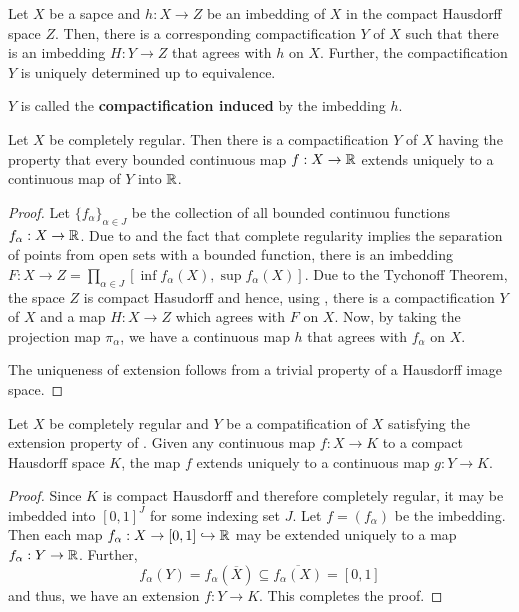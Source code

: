 \begin{lemma}
    Let $X$ be a sapce and $h: X\to Z$ be an imbedding of $X$ in the compact Hausdorff space $Z$. Then, there is a corresponding compactification $Y$ of $X$ such that there is an imbedding $H: Y\to Z$ that agrees with $h$ on $X$. Further, the compactification $Y$ is uniquely determined up to equivalence.
\end{lemma}
$Y$ is called the \textbf{compactification induced} by the imbedding $h$.

    
\begin{theorem}
    Let $X$ be completely regular. Then there is a compactification $Y$ of $X$ having the property that every bounded continuous map $f: X\to\mathbb{R}$ extends uniquely to a continuous map of $Y$ into $\mathbb{R}$.
\end{theorem}
\begin{proof}
    Let $\{f_\alpha\}_{\alpha\in J}$ be the collection of all bounded continuou functions $f_\alpha: X\to\mathbb{R}$. Due to  and the fact that complete regularity implies the separation of points from open sets with a bounded function, there is an imbedding $F: X\to Z = \prod_{\alpha\in J}[\inf f_\alpha(X), \sup f_\alpha(X)]$. Due to the Tychonoff Theorem, the space $Z$ is compact Hasudorff and hence, using , there is a compactification $Y$ of $X$ and a map $H: X\to Z$ which agrees with $F$ on $X$. Now, by taking the projection map $\pi_\alpha$, we have a continuous map $h$ that agrees with $f_\alpha$ on $X$.

    The uniqueness of extension follows from a trivial property of a Hausdorff image space.
\end{proof}

\begin{theorem}
    Let $X$ be completely regular and $Y$ be a compatification of $X$ satisfying the extension property of . Given any continuous map $f: X\to K$ to a compact Hausdorff space $K$, the map $f$ extends uniquely to a continuous map $g: Y\to K$.
\end{theorem}
\begin{proof}
    Since $K$ is compact Hausdorff and therefore completely regular, it may be imbedded into $[0,1]^J$ for some indexing set $J$. Let $f = (f_\alpha)$ be the imbedding. Then each map $f_\alpha: X\to[0,1]\hookrightarrow\mathbb{R}$ may be extended uniquely to a map $f_\alpha: Y\to\mathbb{R}$. Further, 
    \begin{equation*}
        f_\alpha(Y) = f_\alpha(\overline X)\subseteq\overline{f_\alpha(X)} = [0,1]
    \end{equation*}
    and thus, we have an extension $f: Y\to K$. This completes the proof.
\end{proof}

